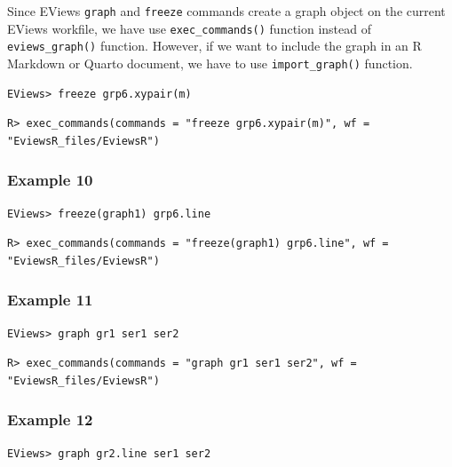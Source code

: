 Since EViews \texttt{graph} and \texttt{freeze} commands create a graph object on the current EViews workfile, we have use \texttt{exec\_commands()} function instead of \texttt{eviews\_graph()} function. However, if we want to include the graph in an R Markdown or Quarto document, we have to use \texttt{import\_graph()} function.

\begin{verbatim}
EViews> freeze grp6.xypair(m)
\end{verbatim}

\begin{verbatim}
R> exec_commands(commands = "freeze grp6.xypair(m)", wf = "EviewsR_files/EviewsR")
\end{verbatim}

\hypertarget{example-10}{%
\subsubsection{Example 10}\label{example-10}}

\begin{verbatim}
EViews> freeze(graph1) grp6.line
\end{verbatim}

\begin{verbatim}
R> exec_commands(commands = "freeze(graph1) grp6.line", wf = "EviewsR_files/EviewsR")
\end{verbatim}

\hypertarget{example-11}{%
\subsubsection{Example 11}\label{example-11}}

\begin{verbatim}
EViews> graph gr1 ser1 ser2
\end{verbatim}

\begin{verbatim}
R> exec_commands(commands = "graph gr1 ser1 ser2", wf = "EviewsR_files/EviewsR")
\end{verbatim}

\hypertarget{example-12}{%
\subsubsection{Example 12}\label{example-12}}

\begin{verbatim}
EViews> graph gr2.line ser1 ser2
\end{verbatim}

